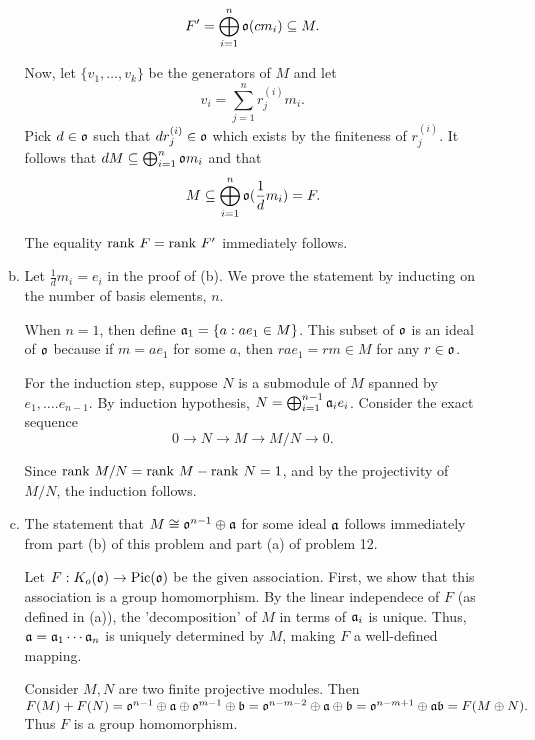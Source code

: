 \documentclass{article}
\theoremstyle{definition}
\theoremstyle{remark}
\begin{document}
\begin{enumerate}[(1)]
\begin{enumerate}[(a)]
                      $$F' = \bigoplus_{i = 1}^n \mathfrak{o} (cm_i)  \subseteq M.$$

                      Now, let $\{v_1, \dots, v_k\}$ be the generators of $M$ and let
                      $$v_i = \sum_{j = 1}^n r_j^{(i)}m_i.$$
                      Pick $d \in \mathfrak{o}$ such that $dr_j^{(i)} \in \mathfrak{o}$ which exists by the finiteness of $r_j^{(i)}$. It follows that $dM \subseteq \bigoplus_{i = 1}^n \mathfrak{o} m_i$ and that
                      $$M \subseteq \bigoplus_{i = 1}^{n} \mathfrak{o} (\frac{1}d m_i) = F.$$

                      The equality $\mathrm{rank}\ F = \mathrm{rank}\ F'$ immediately follows.

                \item
                      Let $\frac{1}d m_i = e_i$ in the proof of (b).  We prove the statement by inducting on the number of basis elements, $n$.

                      When $n = 1$,  then define $\mathfrak{a}_1 = \{a : ae_1 \in M\}$. This subset of $\mathfrak{o}$ is an ideal of $\mathfrak{o}$ because if $m = ae_1$ for some $a$, then $rae_1 = rm \in M$ for any $r \in \mathfrak{o}$.

                      For the induction step, suppose $N$ is a submodule of $M$ spanned by $e_1, \dots. e_{n-1}.$ By induction hypothesis, $N = \bigoplus_{i=1}^{n-1} \mathfrak{a}_ie_i$. Consider the exact sequence
                      $$ 0 \to N \to M \to M/N \to 0.$$

                      Since $\mathrm{rank}\ M/N = \mathrm{rank}\ M - \mathrm{rank}\ N = 1$, and by the projectivity of $M/N$, the induction follows.

                \item
                      The statement that $M \cong \mathfrak{o}^{n-1}\oplus \mathfrak{a}$ for some ideal $\mathfrak{a}$ follows immediately from part (b) of this problem and part (a) of problem 12.

                      \newcommand{\Pic}{\mathrm{Pic}}
                      Let $F: K_o(\io) \to \Pic(\io)$ be the given association. First, we show that this association is a group homomorphism. By the linear independece of $F$ (as defined in (a)), the
                      'decomposition' of $M$ in terms of $\mathfrak{a}_i$ is unique. Thus, $\mathfrak{a} = \mathfrak{a}_1 \cdots \mathfrak{a}_n$ is uniquely determined by $M$, making $F$ a well-defined mapping.

                      Consider $M, N$ are two finite projective modules. Then $F(M) + F(N) = \mathfrak{o}^{n-1} \oplus \mathfrak{a} \oplus \mathfrak{o}^{m-1}\oplus \mathfrak{b} = \mathfrak{o}^{n-m-2} \oplus \mathfrak{a} \oplus \mathfrak{b} = \mathfrak{o}^{n-m+1}\oplus \mathfrak{a} \mathfrak{b} = F(M \oplus N).$ Thus $F$ is a group homomorphism.


\end{enumerate}
\end{enumerate}
\end{document}
